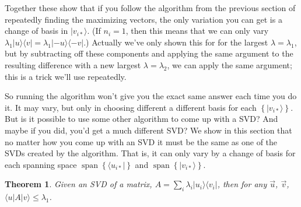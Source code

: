 \documentclass{amsbook}
\newtheorem{theorem}{Theorem}
\begin{document}
Together these show that if you follow the algorithm from the previous section of repeatedly finding the maximizing vectors, the only variation you can get is a change of basis in $|v_{i*}\rangle$.  (If $n_i=1$, then this means that we can only vary $\lambda_1|u\rangle\langle v|=\lambda_1|-u\rangle\langle -v|$.)  Actually we've only shown this for for the largest $\lambda=\lambda_1$, but by subtracting off these components and applying the same argument to the resulting difference with a new largest $\lambda=\lambda_2$, we can apply the same argument; this is a trick we'll use repeatedly.

So running the algorithm won't give you the exact same answer each time you do it.  It may vary, but only in choosing different a different basis for each $\left\{|v_{i*}\rangle\right\}$.  But is it possible to use some other algorithm to come up with a SVD?  And maybe if you did, you'd get a much different SVD?  We show in this section that no matter how you come up with an SVD it must be the same as one of the SVDs created by the algorithm.  That is, it can only vary by a change of basis for each spanning space $\operatorname{span}\left\{\langle u_{i*}|\right\}$ and $\operatorname{span}\left\{|v_{i*}\rangle\right\}$.

 \begin{theorem}
\label{upperbound}
Given an SVD of a matrix, $A=\sum_i\lambda_i|u_i\rangle\langle v_i|$, then for any $\vec u$, $\vec v$, $\langle u|A|v\rangle\leq\lambda_1$.
 \end{theorem}
\end{document}
